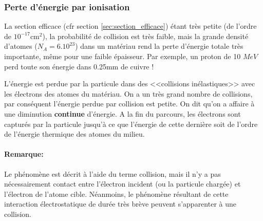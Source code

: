 \subsubsection{Perte d'énergie par ionisation}

La section efficace (cfr section \ref{sec:section_efficace}) étant très petite (de l'ordre de $10^{-17}$cm$^2$), la probabilité de collision est très faible, mais la grande densité d'atomes ($N_A=6.10^{23}$) dans un matériau rend la perte d'énergie totale très importante, même pour une faible épaisseur. Par exemple, un proton de 10 $MeV$ perd toute son énergie dans 0.25mm de cuivre !

L'énergie est perdue par la particule dans des <<collisions inélastiques>> avec les électrons des atomes du matériau. On a un très grand nombre de collisions, par conséquent l'énergie perdue par collision est petite. On dit qu'on a affaire à une diminution \textbf{continue} d'énergie. A la fin du parcours, les électrons sont capturés par la particule jusqu'à ce que l'énergie de cette dernière soit de l'ordre de l'énergie thermique des atomes du milieu.

\paragraph{Remarque:} Le phénomène est décrit à l'aide du terme collision, mais il n'y a pas nécessairement contact entre l'électron incident (ou la particule chargée) et l'électron de l'atome cible. Néanmoins, le phénomène résultant de cette interaction électrostatique de durée très brève peuvent s'apparenter à une collision.

